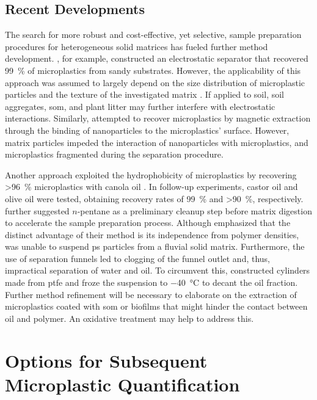 \subsection{Recent Developments}
\label{sec:analytical-techniques:recent-developments}

The search for more robust and cost-effective, yet selective, sample preparation procedures for heterogeneous solid matrices has fueled further method development. , for example,
constructed an electrostatic separator that recovered \SI{99}{\percent} of microplastics from sandy substrates. However, the applicability of this approach was assumed to largely depend on the size distribution of microplastic particles and the texture of the investigated matrix \citep{EndersEvaluation2020}. If applied to soil, soil aggregates, \ac{som},
and plant litter may further interfere with electrostatic interactions.
Similarly, \citet{GrbicMagnetic2019} attempted to recover microplastics by magnetic extraction through the binding of  nanoparticles to the microplastics' surface. However, matrix particles impeded the interaction of nanoparticles with microplastics, and microplastics fragmented during the separation procedure.

Another approach exploited the hydrophobicity of microplastics by recovering \SI{>96}{\percent} microplastics with canola oil \citep{CrichtonNovel2017}. In follow-up experiments, castor oil \citep{ManiUsing2019} and olive oil \citep{ScopetaniOlive2020} were tested,
obtaining recovery rates of \SI{99}{\percent} and \SI{>90}{\percent},
respectively.  further suggested $n$-pentane as a preliminary cleanup step before matrix digestion to accelerate the sample preparation process. Although \citet{ScopetaniOlive2020} emphasized that the distinct advantage of their method is its independence from polymer densities, \citet{ManiUsing2019} was unable to suspend \ac{ps} particles from a fluvial solid matrix. Furthermore, the use of separation funnels led to clogging of the funnel outlet and, thus, impractical separation of water and oil. To circumvent this, \citet{ScopetaniOlive2020} constructed cylinders made from \ac{ptfe} and froze the suspension to \SI{-40}{\degreeCelsius} to decant the oil fraction. Further method refinement will be necessary to elaborate on the extraction of microplastics coated with \ac{som} or biofilms that might hinder the contact between oil and polymer. An oxidative treatment may help to address this.

\section{Options for Subsequent Microplastic Quantification}
\label{sec:analytical-techniques:analysis}

